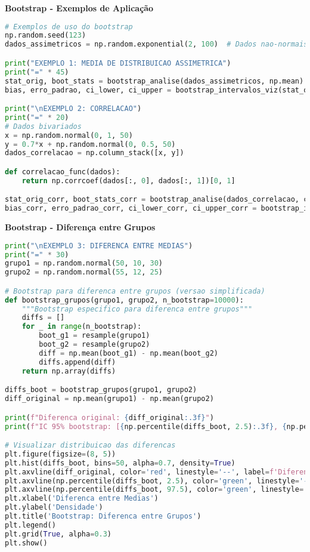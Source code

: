 \begin{researchbox}
\textbf{Bootstrap - Exemplos de Aplicação}

\begin{lstlisting}[language=Python]
# Exemplos de uso do bootstrap
np.random.seed(123)
dados_assimetricos = np.random.exponential(2, 100)  # Dados nao-normais

print("EXEMPLO 1: MEDIA DE DISTRIBUICAO ASSIMETRICA")
print("=" * 45)
stat_orig, boot_stats = bootstrap_analise(dados_assimetricos, np.mean)
bias, erro_padrao, ci_lower, ci_upper = bootstrap_intervalos_viz(stat_orig, boot_stats)

print("\nEXEMPLO 2: CORRELACAO")
print("=" * 20)
# Dados bivariados
x = np.random.normal(0, 1, 50)
y = 0.7*x + np.random.normal(0, 0.5, 50)
dados_correlacao = np.column_stack([x, y])

def correlacao_func(dados):
    return np.corrcoef(dados[:, 0], dados[:, 1])[0, 1]

stat_orig_corr, boot_stats_corr = bootstrap_analise(dados_correlacao, correlacao_func)
bias_corr, erro_padrao_corr, ci_lower_corr, ci_upper_corr = bootstrap_intervalos_viz(stat_orig_corr, boot_stats_corr)
\end{lstlisting}
\end{researchbox}

\begin{researchbox}
\textbf{Bootstrap - Diferença entre Grupos}

\begin{lstlisting}[language=Python]
print("\nEXEMPLO 3: DIFERENCA ENTRE MEDIAS")
print("=" * 30)
grupo1 = np.random.normal(50, 10, 30)
grupo2 = np.random.normal(55, 12, 25)

# Bootstrap para diferenca entre grupos (versao simplificada)
def bootstrap_grupos(grupo1, grupo2, n_bootstrap=10000):
    """Bootstrap especifico para diferenca entre grupos"""
    diffs = []
    for _ in range(n_bootstrap):
        boot_g1 = resample(grupo1)
        boot_g2 = resample(grupo2)
        diff = np.mean(boot_g1) - np.mean(boot_g2)
        diffs.append(diff)
    return np.array(diffs)

diffs_boot = bootstrap_grupos(grupo1, grupo2)
diff_original = np.mean(grupo1) - np.mean(grupo2)

print(f"Diferenca original: {diff_original:.3f}")
print(f"IC 95% bootstrap: [{np.percentile(diffs_boot, 2.5):.3f}, {np.percentile(diffs_boot, 97.5):.3f}]")

# Visualizar distribuicao das diferencas
plt.figure(figsize=(8, 5))
plt.hist(diffs_boot, bins=50, alpha=0.7, density=True)
plt.axvline(diff_original, color='red', linestyle='--', label=f'Diferenca observada: {diff_original:.3f}')
plt.axvline(np.percentile(diffs_boot, 2.5), color='green', linestyle='--', alpha=0.7)
plt.axvline(np.percentile(diffs_boot, 97.5), color='green', linestyle='--', alpha=0.7, label='IC 95%')
plt.xlabel('Diferenca entre Medias')
plt.ylabel('Densidade')
plt.title('Bootstrap: Diferenca entre Grupos')
plt.legend()
plt.grid(True, alpha=0.3)
plt.show()
\end{lstlisting}
\end{researchbox}

